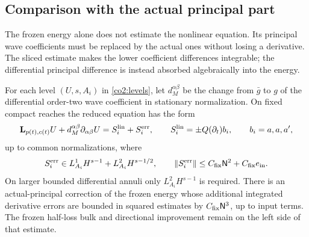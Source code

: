 \subsection{Comparison with the actual principal part}

The frozen energy alone does not estimate the nonlinear equation.  Its
principal wave coefficients must be replaced by the actual ones without
losing a derivative.  The sliced estimate makes the lower coefficient
differences integrable; the differential principal difference is instead
absorbed algebraically into the energy.

\begin{proposition}\label{co2:actual-comparison}
For each level $(U,s,A_i)$ in \eqref{co2:levels}, let
$d_M^{\alpha\beta}$ be the change from $\bar g$ to $g$ of the differential
order-two wave coefficient in stationary normalization.  On fixed compact
reaches the reduced equation has the form
\begin{equation}\label{co2:source-ledger}
 \mathbf L_{p(t),c(t)}U+d_M^{\alpha\beta}\partial_{\alpha\beta}U
       =S_i^{\rm lin}+S_i^{\rm err},\qquad
 S_i^{\rm lin}=\pm Q(\partial_t)b_i,\qquad
 b_i=a,a,a',
\end{equation}
up to common normalizations, where
\begin{equation}\label{co2:error-source-space}
 S_i^{\rm err}\in L^1_{A_i}H^{s-1}+L^2_{A_i}H^{s-1/2},
 \qquad
 \|S_i^{\rm err}\|\le C_{\rm fix}\mathsf N^2
                         +C_{\rm fix}e_{\rm in}.
\end{equation}
On larger bounded differential annuli only $L^2_{A_i}H^{s-1}$ is required.
There is an actual-principal correction of the frozen energy whose additional
integrated derivative errors are bounded in squared estimates by
$C_{\rm fix}\mathsf N^3$, up to input terms.  The frozen half-loss bulk and
directional improvement remain on the left side of that estimate.
\end{proposition}

